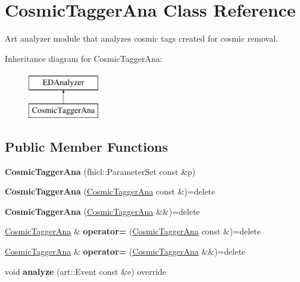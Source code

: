 \hypertarget{classCosmicTaggerAna}{\section{Cosmic\-Tagger\-Ana Class Reference}
\label{classCosmicTaggerAna}
}


Art analyzer module that analyzes cosmic tags created for cosmic removal.  


Inheritance diagram for Cosmic\-Tagger\-Ana\-:\begin{figure}[H]
\begin{center}
\leavevmode
\includegraphics[height=2.000000cm]{classCosmicTaggerAna}
\end{center}
\end{figure}
\subsection*{Public Member Functions}
\begin{DoxyCompactItemize}
\item 
\hypertarget{classCosmicTaggerAna_a057039c409136601ac09420faf77c099}{{\bfseries Cosmic\-Tagger\-Ana} (fhicl\-::\-Parameter\-Set const \&p)}\label{classCosmicTaggerAna_a057039c409136601ac09420faf77c099}

\item 
\hypertarget{classCosmicTaggerAna_ae97386c9238c955b1b84fabe9ad2803c}{{\bfseries Cosmic\-Tagger\-Ana} (\hyperlink{classCosmicTaggerAna}{Cosmic\-Tagger\-Ana} const \&)=delete}\label{classCosmicTaggerAna_ae97386c9238c955b1b84fabe9ad2803c}

\item 
\hypertarget{classCosmicTaggerAna_aaa8d188e33c5787293c92dfcb99679c3}{{\bfseries Cosmic\-Tagger\-Ana} (\hyperlink{classCosmicTaggerAna}{Cosmic\-Tagger\-Ana} \&\&)=delete}\label{classCosmicTaggerAna_aaa8d188e33c5787293c92dfcb99679c3}

\item 
\hypertarget{classCosmicTaggerAna_ab28bec4bf2d71de7f6adcaa6d57a8c50}{\hyperlink{classCosmicTaggerAna}{Cosmic\-Tagger\-Ana} \& {\bfseries operator=} (\hyperlink{classCosmicTaggerAna}{Cosmic\-Tagger\-Ana} const \&)=delete}\label{classCosmicTaggerAna_ab28bec4bf2d71de7f6adcaa6d57a8c50}

\item 
\hypertarget{classCosmicTaggerAna_a0ff825d46a57593ef95d8139b92861a8}{\hyperlink{classCosmicTaggerAna}{Cosmic\-Tagger\-Ana} \& {\bfseries operator=} (\hyperlink{classCosmicTaggerAna}{Cosmic\-Tagger\-Ana} \&\&)=delete}\label{classCosmicTaggerAna_a0ff825d46a57593ef95d8139b92861a8}

\item 
\hypertarget{classCosmicTaggerAna_aea04b9a8752a0730aa18c81d298decf9}{void {\bfseries analyze} (art\-::\-Event const \&e) override}\label{classCosmicTaggerAna_aea04b9a8752a0730aa18c81d298decf9}

\end{DoxyCompactItemize}


